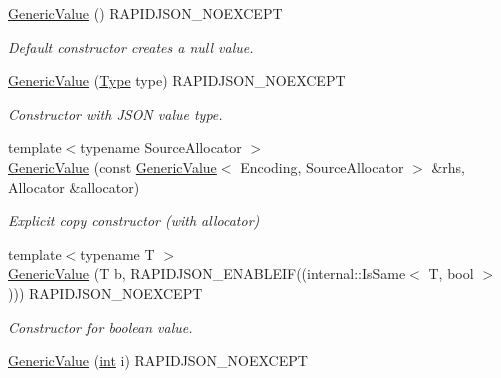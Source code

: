 \begin{DoxyCompactItemize}
\item 
\hypertarget{class_generic_value_ab0205d57176d83814ea4e4598c596fe8}{}\hyperlink{class_generic_value_ab0205d57176d83814ea4e4598c596fe8}{Generic\+Value} () R\+A\+P\+I\+D\+J\+S\+O\+N\+\_\+\+N\+O\+E\+X\+C\+E\+P\+T\label{class_generic_value_ab0205d57176d83814ea4e4598c596fe8}

\begin{DoxyCompactList}\small\item\em Default constructor creates a null value. \end{DoxyCompactList}\item 
\hyperlink{class_generic_value_a83c8f84b8e61f2f40414b703b75aea61}{Generic\+Value} (\hyperlink{rapidjson_8h_a1d1cfd8ffb84e947f82999c682b666a7}{Type} type) R\+A\+P\+I\+D\+J\+S\+O\+N\+\_\+\+N\+O\+E\+X\+C\+E\+P\+T
\begin{DoxyCompactList}\small\item\em Constructor with J\+S\+O\+N value type. \end{DoxyCompactList}\item 
{\footnotesize template$<$typename Source\+Allocator $>$ }\\\hyperlink{class_generic_value_a5161c0c98ba9144c50a38acde28a5ede}{Generic\+Value} (const \hyperlink{class_generic_value}{Generic\+Value}$<$ Encoding, Source\+Allocator $>$ \&rhs, Allocator \&allocator)
\begin{DoxyCompactList}\small\item\em Explicit copy constructor (with allocator) \end{DoxyCompactList}\item 
{\footnotesize template$<$typename T $>$ }\\\hyperlink{class_generic_value_a88f02daf621c42b96d49d608fa9214de}{Generic\+Value} (T b, R\+A\+P\+I\+D\+J\+S\+O\+N\+\_\+\+E\+N\+A\+B\+L\+E\+I\+F((internal\+::\+Is\+Same$<$ T, bool $>$))) R\+A\+P\+I\+D\+J\+S\+O\+N\+\_\+\+N\+O\+E\+X\+C\+E\+P\+T
\begin{DoxyCompactList}\small\item\em Constructor for boolean value. \end{DoxyCompactList}\item 
\hypertarget{class_generic_value_aafc754ade38421c179f5c8933ecbaf45}{}\hyperlink{class_generic_value_aafc754ade38421c179f5c8933ecbaf45}{Generic\+Value} (\hyperlink{_s_d_l__thread_8h_a6a64f9be4433e4de6e2f2f548cf3c08e}{int} i) R\+A\+P\+I\+D\+J\+S\+O\+N\+\_\+\+N\+O\+E\+X\+C\+E\+P\+T\label{class_generic_value_aafc754ade38421c179f5c8933ecbaf45}


\end{DoxyCompactItemize}
